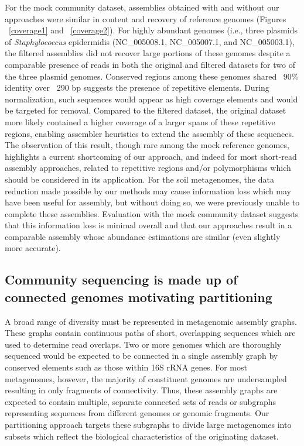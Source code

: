 \documentclass[11pt]{article} %
\begin{document}
For the mock community dataset, assemblies obtained with and without our approaches were similar in content and recovery of reference genomes (Figures ~\ref{coverage1} and ~\ref{coverage2}).  For highly abundant genomes (i.e., three plasmids of \emph{Staphylococcus} epidermidis (NC\_005008.1, NC\_005007.1, and NC\_005003.1), the filtered assemblies did not recover large portions of these genomes despite a comparable presence of reads in both the original and filtered datasets for two of the three plasmid genomes.  Conserved regions among these genomes shared ~90\% identity over ~290 bp suggests the presence of repetitive elements.  During normalization, such sequences would appear as high coverage elements and would be targeted for removal.   Compared to the filtered dataset, the original dataset more likely contained a higher coverage of a larger spans of these repetitive regions, enabling assembler heuristics to extend the assembly of these sequences.  The observation of this result, though rare among the mock reference genomes, highlights a current shortcoming of our approach, and indeed for most short-read assembly approaches, related to repetitive regions and/or polymorphisms which should be considered in its application.  For the soil metagenomes, the data reduction made possible by our methods may cause information loss which may have been useful for assembly, but without doing so, we were previously unable to complete these assemblies.  Evaluation with the mock community dataset suggests that this information loss is minimal overall and that our approaches result in a comparable assembly whose abundance estimations are similar (even slightly more accurate).   

\subsection{Community sequencing is made up of connected genomes motivating partitioning}

A broad range of diversity must be represented in metagenomic assembly graphs.   These graphs contain continuous paths of short, overlapping sequences which are used to determine read overlaps.  Two or more genomes which are thoroughly sequenced would be expected to be connected in a single assembly graph by conserved elements such as those within 16S rRNA genes.  For most metagenomes, however, the majority of constituent genomes are undersampled resulting in only fragments of connectivity.  Thus, these assembly graphs are expected to contain multiple, separate connected sets of reads or subgraphs representing sequences from different genomes or genomic fragments.  Our partitioning approach targets these subgraphs to divide large metagenomes into subsets which reflect the biological characteristics of the originating dataset.  
\end{document}
